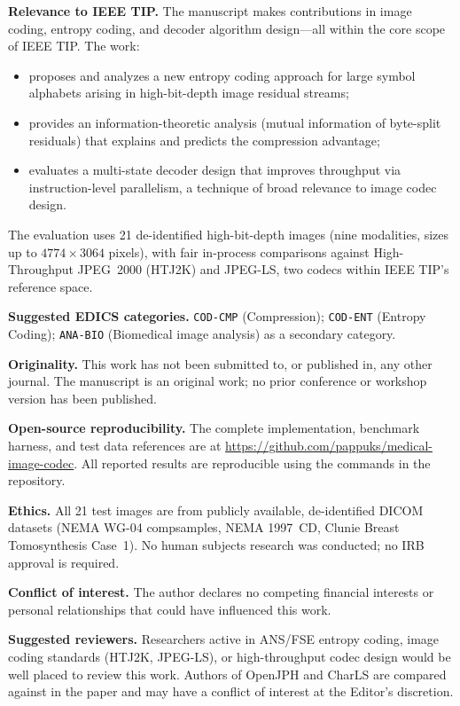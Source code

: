 \documentclass[12pt]{article}
\begin{document}
\medskip
\noindent\textbf{Relevance to IEEE TIP.}
The manuscript makes contributions in image coding, entropy coding, and
decoder algorithm design---all within the core scope of IEEE TIP. The work:
\begin{itemize}
  \item proposes and analyzes a new entropy coding approach for large symbol
  alphabets arising in high-bit-depth image residual streams;
  \item provides an information-theoretic analysis (mutual information of
  byte-split residuals) that explains and predicts the compression advantage;
  \item evaluates a multi-state decoder design that improves throughput via
  instruction-level parallelism, a technique of broad relevance to image codec
  design.
\end{itemize}
The evaluation uses 21 de-identified high-bit-depth images (nine modalities,
sizes up to $4774 \times 3064$ pixels), with fair in-process comparisons
against High-Throughput JPEG~2000 (HTJ2K) and JPEG-LS, two codecs within
IEEE TIP's reference space.

\medskip
\noindent\textbf{Suggested EDICS categories.}
\texttt{COD-CMP} (Compression); \texttt{COD-ENT} (Entropy Coding);
\texttt{ANA-BIO} (Biomedical image analysis) as a secondary category.

\medskip
\noindent\textbf{Originality.}
This work has not been submitted to, or published in, any other journal.
The manuscript is an original work; no prior conference or workshop version
has been published.

\medskip
\noindent\textbf{Open-source reproducibility.}
The complete implementation, benchmark harness, and test data references
are at \url{https://github.com/pappuks/medical-image-codec}. All reported
results are reproducible using the commands in the repository.

\medskip
\noindent\textbf{Ethics.}
All 21 test images are from publicly available, de-identified DICOM datasets
(NEMA WG-04 compsamples, NEMA 1997~CD, Clunie Breast Tomosynthesis Case~1).
No human subjects research was conducted; no IRB approval is required.

\medskip
\noindent\textbf{Conflict of interest.}
The author declares no competing financial interests or personal relationships
that could have influenced this work.

\medskip
\noindent\textbf{Suggested reviewers.}
Researchers active in ANS/FSE entropy coding, image coding standards (HTJ2K,
JPEG-LS), or high-throughput codec design would be well placed to review
this work. Authors of OpenJPH and CharLS are compared against in the paper
and may have a conflict of interest at the Editor's discretion.
\end{document}
